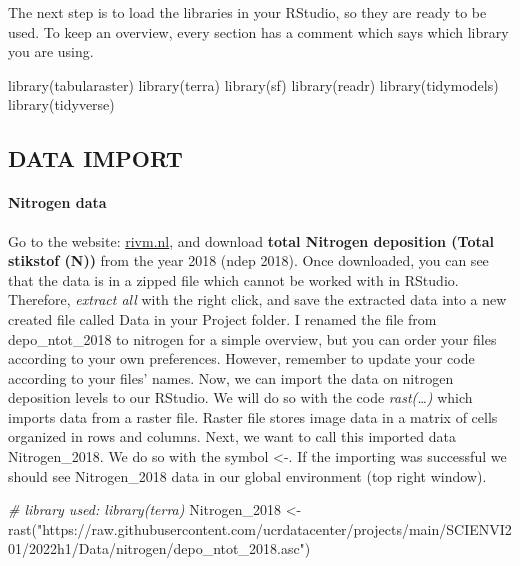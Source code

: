 \documentclass[
]{article}
\newenvironment{Shaded}{\begin{snugshade}}{\end{snugshade}}
\newcommand{\CommentTok}[1]{\textcolor[rgb]{0.56,0.35,0.01}{\textit{#1}}}
\newcommand{\FunctionTok}[1]{\textcolor[rgb]{0.00,0.00,0.00}{#1}}
\newcommand{\NormalTok}[1]{#1}
\newcommand{\OtherTok}[1]{\textcolor[rgb]{0.56,0.35,0.01}{#1}}
\newcommand{\StringTok}[1]{\textcolor[rgb]{0.31,0.60,0.02}{#1}}
\begin{document}
The next step is to load the libraries in your RStudio, so they are
ready to be used. To keep an overview, every section has a comment which
says which library you are using.

\begin{Shaded}
\begin{Highlighting}[]
\FunctionTok{library}\NormalTok{(tabularaster)}
\FunctionTok{library}\NormalTok{(terra)}
\FunctionTok{library}\NormalTok{(sf)}
\FunctionTok{library}\NormalTok{(readr)}
\FunctionTok{library}\NormalTok{(tidymodels)}
\FunctionTok{library}\NormalTok{(tidyverse)}
\end{Highlighting}
\end{Shaded}

\hypertarget{data-import}{%
\subsection{DATA IMPORT}\label{data-import}}

\hypertarget{nitrogen-data}{%
\paragraph{Nitrogen data}\label{nitrogen-data}}

Go to the website:
\href{https://www.rivm.nl/gcn-gdn-kaarten/depositiekaarten/cijfers-achter-depositiekaarten/gdn-depositiebestanden-achterliggende-jaren}{rivm.nl},
and download \textbf{total Nitrogen deposition (Total stikstof (N))}
from the year 2018 (ndep 2018). Once downloaded, you can see that the
data is in a zipped file which cannot be worked with in RStudio.
Therefore, \emph{extract all} with the right click, and save the
extracted data into a new created file called Data in your Project
folder. I renamed the file from depo\_ntot\_2018 to nitrogen for a
simple overview, but you can order your files according to your own
preferences. However, remember to update your code according to your
files' names. Now, we can import the data on nitrogen deposition levels
to our RStudio. We will do so with the code \emph{rast(\ldots)} which
imports data from a raster file. Raster file stores image data in a
matrix of cells organized in rows and columns. Next, we want to call
this imported data Nitrogen\_2018. We do so with the symbol \textless-.
If the importing was successful we should see Nitrogen\_2018 data in our
global environment (top right window).

\begin{Shaded}
\begin{Highlighting}[]
\CommentTok{\# library used: library(terra)}
\NormalTok{Nitrogen\_2018 }\OtherTok{\textless{}{-}} 
  \FunctionTok{rast}\NormalTok{(}\StringTok{"https://raw.githubusercontent.com/ucrdatacenter/projects/main/SCIENVI201/2022h1/Data/nitrogen/depo\_ntot\_2018.asc"}\NormalTok{)}
\end{Highlighting}
\end{Shaded}
\end{document}
